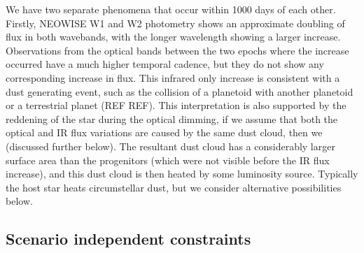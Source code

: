 \documentclass{aa}
\newcommand{\asas}{ASASSN-21qj}
\begin{document}
We have two separate phenomena that occur within 1000 days of each other.
%
Firstly, NEOWISE W1 and W2 photometry shows an approximate doubling of flux in both wavebands, with the longer wavelength showing a larger increase.
%
Observations from the optical bands between the two epochs where the increase occurred have a much higher temporal cadence, but they do not show any corresponding increase in flux.
%
This infrared only increase is consistent with a dust generating event, such as the collision of a planetoid with another planetoid or a terrestrial planet (REF REF).
%
This interpretation is also supported by the reddening of the star during the optical dimming, if we assume that both the optical and IR flux variations are caused by the same dust cloud, then we  (discussed further below).
%
The resultant dust cloud has a considerably larger surface area than the progenitors (which were not visible before the IR flux increase), and this dust cloud is then heated by some luminosity source.
%
Typically the host star heats circumstellar dust, but we consider alternative possibilities below.
%


\subsection{Scenario independent constraints}
\end{document}

